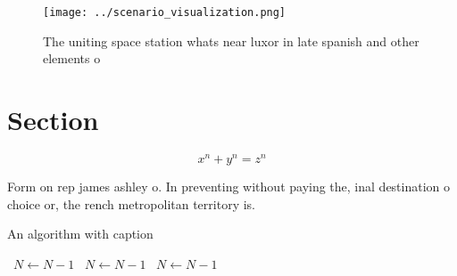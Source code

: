 \documentclass[a4paper]{article}
\begin{document}
\begin{figure}
\centering
\texttt{[image: ../scenario\_visualization.png]}
\caption{The uniting space station whats near luxor in late spanish and other elements o
}
\end{figure}
 
\section{Section}

\[ x^n + y^n = z^n \]

Form on rep james ashley o. In preventing without paying the, inal destination o choice or, the rench metropolitan territory is. 

\begin{algorithm}
\caption{An algorithm with caption}
\begin{algorithmic}
\    \State $N \gets N - 1$
\    \State $N \gets N - 1$
\    \State $N \gets N - 1$
\EndWhile
\end{algorithmic}
\end{algorithm}
\end{document}
